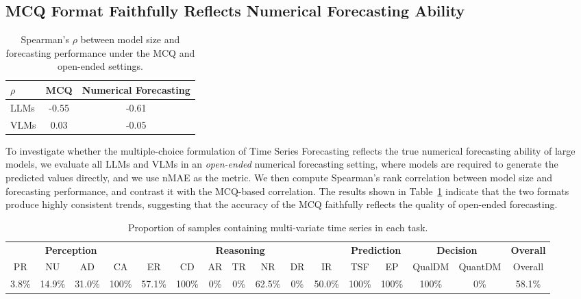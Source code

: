 \documentclass{article}
\theoremstyle{plain}
\theoremstyle{definition}
\theoremstyle{remark}
\theoremstyle{plain}
\begin{document}
    \subsection{MCQ Format Faithfully Reflects Numerical Forecasting Ability}

\begin{table}
\vspace{-20pt}
\centering
\caption{Spearman's $\rho$ between model size and forecasting performance under the MCQ and open-ended settings.}
\label{tab:mcq_vs_openended}
\small
\begin{tabular}{lcc}
\toprule
\textbf{$\rho$} & \textbf{MCQ} & \textbf{Numerical Forecasting} \\
\midrule
LLMs & -0.55 & -0.61 \\
VLMs & \phantom{-}0.03  & -0.05 \\
\bottomrule
\end{tabular}

\end{table}

To investigate whether the multiple-choice formulation of Time Series Forecasting reflects the true numerical forecasting ability of large models, we evaluate all LLMs and VLMs in an \emph{open-ended} numerical forecasting setting, where models are required to generate the predicted values directly, and we use nMAE as the metric. We then compute Spearman's rank correlation between model size and forecasting performance, and contrast it with the MCQ-based correlation. The results shown in Table~\ref{tab:mcq_vs_openended} indicate that the two formats produce highly consistent trends, suggesting that the accuracy of the MCQ faithfully reflects the quality of open-ended forecasting.

\begin{table}[t]
\centering
\small
\setlength{\tabcolsep}{4pt}
\caption{Proportion of samples containing multi-variate time series in each task.}
\label{tab: multivariate}
\begin{tabular}{cccc|ccccccc|cc|cc|c}
\toprule
\multicolumn{4}{c|}{\textbf{Perception}} & \multicolumn{7}{c|}{\textbf{Reasoning}} & \multicolumn{2}{c|}{\textbf{Prediction}} & \multicolumn{2}{c|}{\textbf{Decision}} & \textbf{Overall} \\
\cmidrule(lr){1-4} \cmidrule(lr){5-11} \cmidrule(lr){12-13} \cmidrule(lr){14-15} \cmidrule(lr){16-16}
PR & NU & AD & CA & ER & CD & AR & TR & NR & DR & IR & TSF & EP & QualDM & QuantDM & Overall \\
\midrule
3.8\% & 14.9\% & 31.0\% & 100\% & 57.1\% & 100\% & 0\% & 0\% & 62.5\% & 0\% & 50.0\% & 100\% & 100\% & 100\% & 0\% & 58.1\% \\
\bottomrule
\end{tabular}
\end{table}
\end{document}

